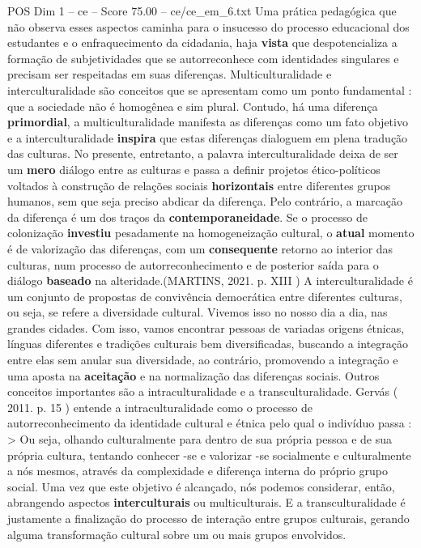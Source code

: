 \begin{textsample}{POS Dim 1 – ce – Score 75.00 – ce/ce\_em\_6.txt}
Uma prática pedagógica que não observa esses aspectos caminha para o insucesso do processo educacional dos estudantes e o enfraquecimento da cidadania, haja \textbf{vista} que despotencializa a formação de subjetividades que se autorreconhece com identidades singulares e precisam ser respeitadas em suas diferenças.
Multiculturalidade e interculturalidade são conceitos que se apresentam como um ponto fundamental : que a sociedade não é homogênea e sim plural.
Contudo, há uma diferença \textbf{primordial}, a multiculturalidade manifesta as diferenças como um fato objetivo e a interculturalidade \textbf{inspira} que estas diferenças dialoguem em plena tradução das culturas.
No presente, entretanto, a palavra interculturalidade deixa de ser um \textbf{mero} diálogo entre as culturas e passa a definir projetos ético-políticos voltados à construção de relações sociais \textbf{horizontais} entre diferentes grupos humanos, sem que seja preciso abdicar da diferença.
Pelo contrário, a marcação da diferença é um dos traços da \textbf{contemporaneidade}.
Se o processo de colonização \textbf{investiu} pesadamente na homogeneização cultural, o \textbf{atual} momento é de valorização das diferenças, com um \textbf{consequente} retorno ao interior das culturas, num processo de autorreconhecimento e de posterior saída para o diálogo \textbf{baseado} na alteridade.(MARTINS, 2021. p.
XIII ) A interculturalidade é um conjunto de propostas de convivência democrática entre diferentes culturas, ou seja, se refere a diversidade cultural.
Vivemos isso no nosso dia a dia, nas grandes cidades.
Com isso, vamos encontrar pessoas de variadas origens étnicas, línguas diferentes e tradições culturais bem diversificadas, buscando a integração entre elas sem anular sua diversidade, ao contrário, promovendo a integração e uma aposta na \textbf{aceitação} e na normalização das diferenças sociais.
Outros conceitos importantes são a intraculturalidade e a transculturalidade.
Gervás ( 2011. p. 15 ) entende a intraculturalidade como o processo de autorreconhecimento da identidade cultural e étnica pelo qual o indivíduo passa : > Ou seja, olhando culturalmente para dentro de sua própria pessoa e de sua própria cultura, tentando conhecer -se e valorizar -se socialmente e culturalmente a nós mesmos, através da complexidade e diferença interna do próprio grupo social.
Uma vez que este objetivo é alcançado, nós podemos considerar, então, abrangendo aspectos \textbf{interculturais} ou multiculturais.
E a transculturalidade é justamente a finalização do processo de interação entre grupos culturais, gerando alguma transformação cultural sobre um ou mais grupos envolvidos.

\end{textsample}
